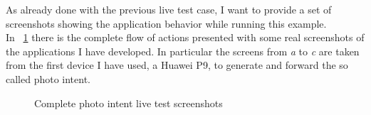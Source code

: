 As already done with the previous live test case, I want to provide a set of screenshots showing the application behavior while running this example.\\
In \figurename~\ref{fig:5.9} there is the complete flow of actions presented with some real screenshots of the applications I have developed. In particular the screens from \textit{a} to \textit{c} are taken from the first device I have used, a Huawei P9, to generate and forward the so called photo intent.\\
\begin{figure}[h!]
	\centering
	\begin{minipage}{.24\textwidth}\centering
	\end{minipage}
	\begin{minipage}{.24\textwidth}\centering
	\end{minipage}
	\centering
	\begin{minipage}{.24\textwidth}\centering
	\end{minipage}
	\begin{minipage}{.24\textwidth}\centering
	\end{minipage}
\end{figure}
\begin{figure}[h!]
	\ContinuedFloat
	\centering
	\begin{minipage}{.24\textwidth}\centering
		\bigskip
	\end{minipage}
	\begin{minipage}{.24\textwidth}\centering
		\bigskip
	\end{minipage}
	\begin{minipage}{.24\textwidth}\centering
		\bigskip
	\end{minipage}
	\begin{minipage}{.24\textwidth}\centering
		\bigskip
	\end{minipage}
	\caption{Complete photo intent live test screenshots}
	\label{fig:5.9}
\end{figure}\\
